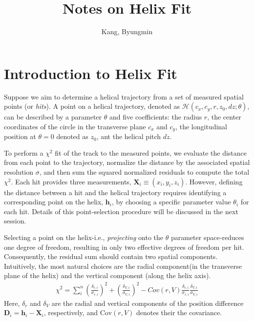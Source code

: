 \documentclass{article}
\title{Notes on Helix Fit}
\author{Kang, Byungmin}
\begin{document}
	\maketitle
	\section{Introduction to Helix Fit}
	Suppose we aim to determine a helical trajectory from a set of measured spatial points (or \textit{hits}). A point on a helical trajectory, denoted as $\mathcal{H}(c_x,c_y,r,z_0,dz;\theta)$, can be described by a parameter $\theta$ and five coefficients: the radius $r$, the center coordinates of the circle in the transverse plane $c_x$ and $c_y$, the longitudinal position at $\theta=0$ denoted as $z_0$, ant the helical pitch $dz$.
	
	To perform a $\chi^2$ fit of the track to the measured points, we evaluate the distance from each point to the trajectory, normalize the distance by the associated spatial resolution $\sigma$, and then sum the squared normalized residuals to compute the total $\chi^2$. Each hit provides three measurements, $\mathbf X_i \equiv (x_i,y_i,z_i)$. However, defining the distance between a hit and the helical trajectory requires identifying a corresponding point on the helix, $\mathbf h_i$, by choosing a specific parameter value $\theta_i$ for each hit. Details of this point-selection procedure will be discussed in the next session.
	
	Selecting a point on the helix-i.e., \textit{projecting} onto the $\theta$ parameter space-reduces one degree of freedom, resulting in only two effective degrees of freedom per hit. Consequently, the residual sum should contain two spatial components. Intuitively, the most natural choices are the radial component(in the transverse plane of the helix) and the vertical component (along the helix axis).
	\begin{align}
		\chi^2 = \sum_i^n(\frac{\delta_{r,i}}{\sigma_{r,i}})^2 + (\frac{\delta_{V,i}}{\sigma_{V,i}})^2 - Cov(r,V)\frac{\delta_{r,i}}{\sigma_{r,i}}\frac{\delta_{V,i}}{\sigma_{V,i}}\label{chi2}
	\end{align}
	Here, $\delta_r$ and $\delta_V$ are the radial and vertical components of the position difference $\mathbf{D}_i = \mathbf{h}_i - \mathbf{X}_i$, respectively, and $\text{Cov}(r,V)$ denotes their the covariance. 
\end{document}
